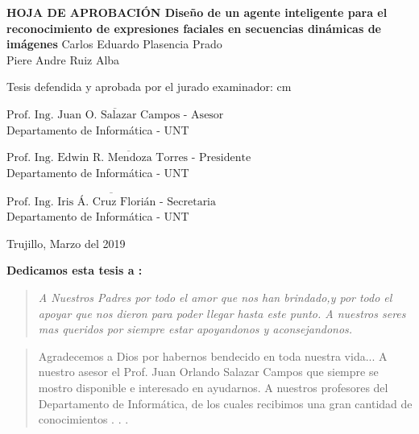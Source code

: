 \begin{center}
 {\bf {\Large HOJA DE APROBACIÓN }     
 \vskip 1.5cm
  {\Large Diseño de un agente inteligente para el reconocimiento de expresiones faciales en secuencias dinámicas de imágenes}}
 \vskip 1cm 
  {\large{Carlos Eduardo Plasencia Prado}}\\
    {\large{Piere Andre Ruiz Alba}}

 \vskip 1cm
\end{center} 
Tesis defendida y aprobada por el jurado examinador:
 cm
\begin{flushleft} 
$\overline{\mbox{Prof. Ing. Juan O. Salazar Campos - Asesor}}$\\
\vskip -0.5cm
Departamento de Informática - UNT
\end{flushleft} 
\vskip 0.8cm
\begin{flushleft} 
$\overline{\mbox{Prof. Ing. Edwin R. Mendoza Torres - Presidente}}$\\
\vskip -0.5cm
Departamento de Informática - UNT
\end{flushleft} 
\vskip 0.8cm
\begin{flushleft} 
$\overline{\mbox{Prof. Ing. Iris Á. Cruz Florián - Secretaria}}$\\
\vskip -0.5cm
Departamento de Informática - UNT
\end{flushleft}
\vskip 0.5cm 
\begin{center}    
Trujillo, Marzo del 2019
\end{center} 
\newpage


 
 {\bf\Large {Dedicamos esta tesis a :}}
 \vskip 1cm
\begin{quotation}
{\it A Nuestros Padres por todo el amor que nos han brindado,y por todo el apoyar que nos dieron para poder llegar hasta este punto.
\vskip 1cm
A nuestros seres mas queridos por siempre estar apoyandonos y aconsejandonos.
}
\end{quotation}


\newpage

 {\bf\Large {}}
 \vskip 1.5cm
\begin{quotation}
Agradecemos a Dios por habernos bendecido en toda nuestra vida...
{\vskip 1cm}
A nuestro asesor el Prof. Juan Orlando Salazar Campos que siempre se mostro disponible e interesado en ayudarnos.
\vskip 1cm
A nuestros profesores del Departamento de Informática, de los cuales recibimos una gran cantidad de conocimientos  . . .
\vskip 1cm
 \end{quotation}


